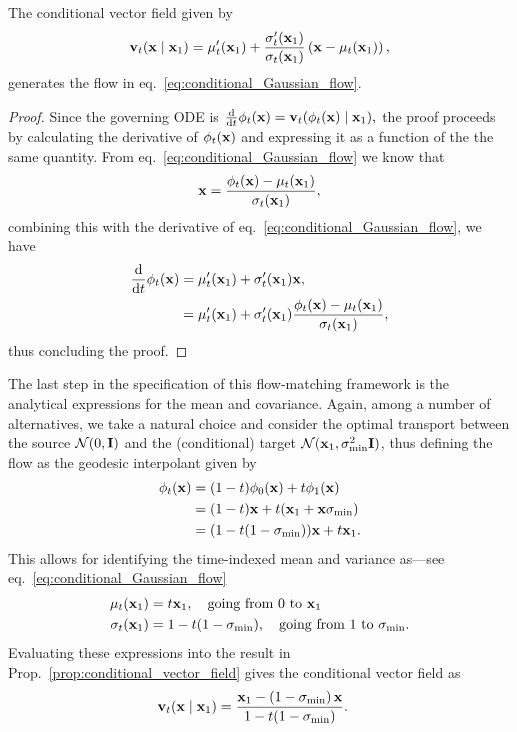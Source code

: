\begin{proposition}
    \label{prop:conditional_vector_field}
    The conditional vector field given by 
    \[
    { \mathbf{v}}_t ({ \mathbf{x}} \mid { \mathbf{x}}_1) = \mu_t'({ \mathbf{x}}_1) + \frac{\sigma_t'({ \mathbf{x}}_1)}{\sigma_t({ \mathbf{x}}_1)}\left({ \mathbf{x}}  - \mu_t({ \mathbf{x}}_1)\right),
    \]
    generates the flow in eq.~\eqref{eq:conditional_Gaussian_flow}.
\end{proposition}
\begin{proof}
    Since the governing ODE is 
\(
\frac{{\text{d}}}{{\text{d}t}}\phi_t({ \mathbf{x}}) = { \mathbf{v}}_t(\phi_t({ \mathbf{x}}) \mid { \mathbf{x}}_1), 
\)
the proof proceeds by calculating the derivative of $\phi_t({ \mathbf{x}})$ and expressing it as a function of the the same quantity. From eq.~\eqref{eq:conditional_Gaussian_flow} we know that 
\[
{ \mathbf{x}} = \frac{\phi_t({ \mathbf{x}}) - \mu_t({ \mathbf{x}}_1)}{\sigma_t({ \mathbf{x}}_1)},
\]
combining this with the derivative of eq.~\eqref{eq:conditional_Gaussian_flow}, we have
\begin{align*}
    \frac{{\text{d}}}{{\text{d}t}}\phi_t({ \mathbf{x}}) 
    &= 
    \mu_t'({ \mathbf{x}}_1) + \sigma_t'({ \mathbf{x}}_1){ \mathbf{x}},\\
    &= 
    \mu_t'({ \mathbf{x}}_1) + \sigma_t'({ \mathbf{x}}_1)\frac{\phi_t({ \mathbf{x}}) - \mu_t({ \mathbf{x}}_1)}{\sigma_t({ \mathbf{x}}_1)},
\end{align*}
thus concluding the proof.

    
\end{proof}

The last step in the specification of this flow-matching framework is the analytical expressions for the mean and covariance. Again, among a number of alternatives, we take a natural choice and consider the optimal transport between the source ${\mathcal N}(0,{\mathbf I})$ and the (conditional) target ${\mathcal N}({ \mathbf{x}}_1,\sigma^2_\text{min}{\mathbf I})$, thus defining the flow as the geodesic interpolant given by 
\begin{align*}
    \phi_t({ \mathbf{x}}) 
    &=  (1-t)\phi_0({ \mathbf{x}}) + t\phi_1({ \mathbf{x}}) \\
    &=  (1-t){ \mathbf{x}} + t({ \mathbf{x}}_1 + { \mathbf{x}}\sigma_\text{min}) \\ 
    &=  (1-t(1-\sigma_\text{min})){ \mathbf{x}} + t{ \mathbf{x}}_1.
\end{align*}
This allows for identifying the time-indexed mean and variance as---see eq.~\eqref{eq:conditional_Gaussian_flow} 
\begin{align*}
    \mu_t({ \mathbf{x}}_1) &= t{ \mathbf{x}}_1,\quad \text{going from $0$ to ${ \mathbf{x}}_1$}\\
    \sigma_t({ \mathbf{x}}_1) &= 1-t(1-\sigma_\text{min}), \quad \text{going from $1$ to $\sigma_\text{min}$}.
\end{align*}
Evaluating these expressions into the result in Prop.~\ref{prop:conditional_vector_field} gives the conditional vector field as
\begin{align}
{ \mathbf{v}}_t({ \mathbf{x}} \mid { \mathbf{x}}_1)
&=
\frac{{ \mathbf{x}}_1 - (1-\sigma_{\min})\,{ \mathbf{x}}}
     {1 - t(1-\sigma_{\min})}.
\end{align}


